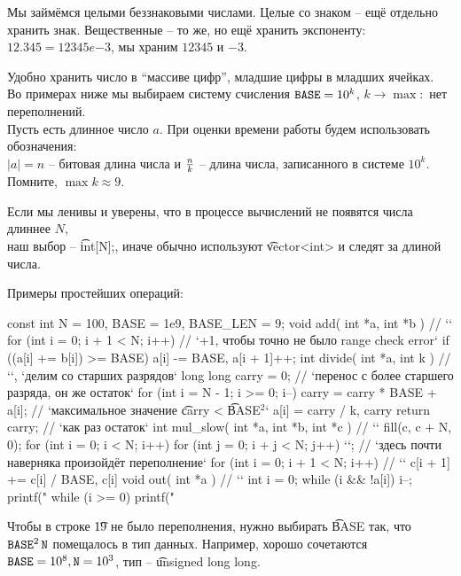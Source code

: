 
Мы займёмся целыми беззнаковыми числами.
Целые со знаком -- ещё отдельно хранить знак.
Вещественные -- то же, но ещё хранить экспоненту: $12.345 = 12345e{-3}$, мы храним $12345$ и $-3$.

\down
Удобно хранить число в ``массиве цифр'', младшие цифры в младших ячейках. \\
Во примерах ниже мы выбираем систему счисления $\texttt{BASE} = 10^k$, $k \to \max \colon$
нет переполнений.\\
Пусть есть длинное число $a$. При оценки времени работы будем использовать обозначения: \\
$|a| = n$ -- битовая длина числа и ${\textstyle\frac{n}{k}}$ -- длина числа, записанного в системе $10^k$.
Помните, $\max k \approx 9$.

\down
Если мы ленивы и уверены, что в процессе вычислений не появятся числа длиннее $N$, \\
наш выбор -- \t{int[N];}, иначе обычно используют \t{vector<int>} и следят за длиной числа.

\down
Примеры простейших операций:
\begin{code}
const int N = 100, BASE = 1e9, BASE_LEN = 9;
void add( int *a, int *b ) { // ``
	for (int i = 0; i + 1 < N; i++) // `+1, чтобы точно не было range check error`
		if ((a[i] += b[i]) >= BASE)
			a[i] -= BASE, a[i + 1]++;
}
int divide( int *a, int k ) { // ``, `делим со старших разрядов`
	long long carry = 0; // `перенос с более старшего разряда, он же остаток`
	for (int i = N - 1; i >= 0; i--) {
		carry = carry * BASE + a[i]; // `максимальное значение \t{carry} < \t{BASE}$^2$`
		a[i] = carry / k, carry %
	}
	return carry; // `как раз остаток`
}
int mul_slow( int *a, int *b, int *c ) { // ``
	fill(c, c + N, 0);
	for (int i = 0; i < N; i++)
		for (int j = 0; i + j < N; j++)
			`\color{dkred}{c[i + j] += a[i] * b[j]}`; // `здесь почти наверняка произойдёт переполнение`
	for (int i = 0; i + 1 < N; i++) // `\color{dkred}{сначала умножаем, затем делаем переносы}`
		c[i + 1] += c[i] / BASE, c[i] %
}
void out( int *a ) { // ``
	int i = 0;
	while (i && !a[i]) i--;
	printf("%
	while (i >= 0) printf("%
}
\end{code}
Чтобы в строке \t{19} не было переполнения, нужно выбирать \t{BASE} так, что $\texttt{BASE}^2\,\texttt{N}$ помещалось
в тип данных. Например, хорошо сочетаются $\texttt{BASE} = 10^8, \texttt{N} = 10^3$, тип -- \t{unsigned long long}.

